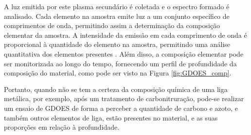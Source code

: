 \par
A luz emitida por este plasma secundário é coletada e o espectro formado é analisado. Cada elemento na amostra emite luz a um conjunto específico de comprimentos de onda, permitindo assim a determinação da composição elementar da amostra. A intensidade da emissão em cada comprimento de onda é proporcional à quantidade do elemento na amostra, permitindo uma análise quantitativa dos elementos presentes \cite{Saraiva2015}. Além disso, a composição elementar pode ser monitorizada ao longo do tempo, fornecendo um perfil de profundidade da composição do material, como pode ser visto na Figura \ref{fig:GDOES_comp}.
\par
Portanto, quando não se tem a certeza da composição química de uma liga metálica, por exemplo, após um tratamento de carbonitruração, pode-se realizar um ensaio de GDOES de forma a perceber a quantidade de carbono e azoto, e também outros elementos de liga, estão presentes no material, e as suas proporções em relação à profundidade.